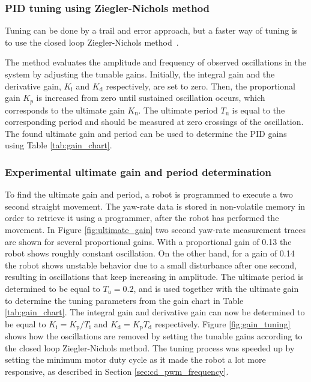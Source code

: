 \subsubsection{PID tuning using Ziegler-Nichols method}

Tuning can be done by a trail and error approach, but a faster way of tuning is to use the closed loop Ziegler-Nichols method~\cite{franklin_feedback_2015}.

The method evaluates the amplitude and frequency of observed oscillations in the system by adjusting the tunable gains.
Initially, the integral gain and the derivative gain, $K_{\text{i}}$ and $K_{\text{d}}$ respectively, are set to zero.
Then, the proportional gain $K_{p}$ is increased from zero until sustained oscillation occurs, which corresponds to the ultimate gain $K_{\text{u}}$.
The ultimate period $T_{\text{u}}$ is equal to the corresponding period and should be measured at zero crossings of the oscillation.
The found ultimate gain and period can be used to determine the PID gains using Table \ref{tab:gain_chart}.

\subsubsection{Experimental ultimate gain and period determination}	

To find the ultimate gain and period, a robot is programmed to execute a two second straight movement.
The yaw-rate data is stored in non-volatile memory in order to retrieve it using a programmer, after the robot has performed the movement.
In Figure \ref{fig:ultimate_gain} two second yaw-rate measurement traces are shown for several proportional gains.
With a proportional gain of 0.13 the robot shows roughly constant oscillation.
On the other hand, for a gain of 0.14 the robot shows unstable behavior due to a small disturbance after one second, resulting in oscillations that keep increasing in amplitude.
The ultimate period is determined to be equal to $T_{u} = 0.2$, and is used together with the ultimate gain to determine the tuning parameters from the gain chart in Table \ref{tab:gain_chart}.
The integral gain and derivative gain can now be determined to be equal to $K_{\text{i}} = K_{\text{p}} / T_{\text{i}}$ and $K_{\text{d}}  = K_{\text{p}}T_{\text{d}}$ respectively.
Figure \ref{fig:gain_tuning} shows how the oscillations are removed by setting the tunable gains according to the closed loop Ziegler-Nichols method.
The tuning process was speeded up by setting the minimum motor duty cycle as it made the robot a lot more responsive, as described in Section \ref{sec:cd_pwm_frequency}.

